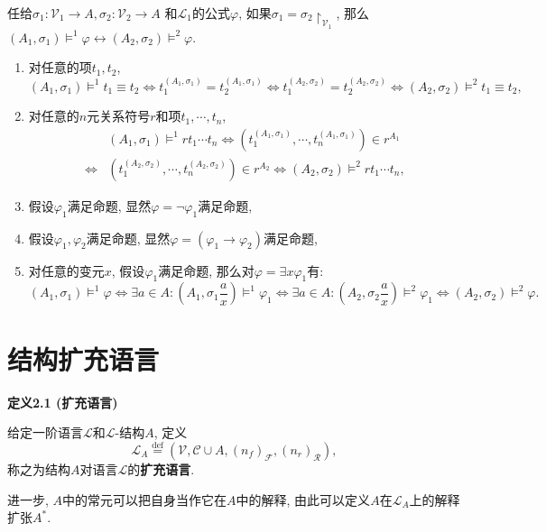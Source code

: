 任给$\sigma_1:\mathcal{V}_1\to A,\sigma_2:\mathcal{V}_2\to A$
和$\mathcal{L}_1$的公式$\varphi$, 如果$\sigma_1=\sigma_2\!\restriction_{\mathcal{V}_1}$, 那么
$(A_1,\sigma_1)\models^1\varphi\leftrightarrow(A_2,\sigma_2)\models^2\varphi$.


\begin{enumerate}
    \item 对任意的项$t_1,t_2$,
    \[
        (A_1,\sigma_1)\models^1t_1\equiv t_2\iff
        t_1^{(A_1,\sigma_1)}=t_2^{(A_1,\sigma_1)}\iff
        t_1^{(A_2,\sigma_2)}=t_2^{(A_2,\sigma_2)}\iff
        (A_2,\sigma_2)\models^2t_1\equiv t_2,
    \]
    \item 对任意的$n$元关系符号$r$和项$t_1,\cdots,t_n$,
    \[\begin{aligned}
        &(A_1,\sigma_1)\models^1rt_1\cdots t_n\iff
        (t_1^{(A_1,\sigma_1)},\cdots,t_n^{(A_1,\sigma_1)})\in r^{A_1}\\[-3pt]
        \iff&(t_1^{(A_2,\sigma_2)},\cdots,t_n^{(A_2,\sigma_2)})\in r^{A_2}\iff
        (A_2,\sigma_2)\models^2rt_1\cdots t_n,
    \end{aligned}\]
    \item 假设$\varphi_1$满足命题, 显然$\varphi=\neg\varphi_1$满足命题,
    \item 假设$\varphi_1,\varphi_2$满足命题,
    显然$\varphi=(\varphi_1\to\varphi_2)$满足命题,
    \item 对任意的变元$x$, 假设$\varphi_1$满足命题,
    那么对$\varphi=\exists x\varphi_1$有:
    \begin{equation*}
        (A_1,\sigma_1)\models^1\varphi\iff
        \exists a\in A:\left(A_1,\sigma_1\frac{a}{x}\right)\models^1\varphi_1\iff
        \exists a\in A:\left(A_2,\sigma_2\frac{a}{x}\right)\models^2\varphi_1\iff
        (A_2,\sigma_2)\models^2\varphi.
    \tag*{\qedsymbol}\end{equation*}
\end{enumerate}

\vspace{20pt}





\section{结构扩充语言}

\hypertarget{sec:定义2.1}{}
\noindent\textbf{定义2.1 (扩充语言)}

给定一阶语言$\mathcal{L}$和$\mathcal{L}$-结构$A$, 定义
\[
    \mathcal{L}_A\overset{\mathrm{def}}{=}(\mathcal{V},\mathcal{C}\cup A,
    (n_f)_{\mathcal{F}},(n_r)_{\mathcal{R}}),
\]
称之为结构$A$对语言$\mathcal{L}$的\textbf{扩充语言}.


\vspace{10pt}

进一步, $A$中的常元可以把自身当作它在$A$中的解释,
由此可以定义$A$在$\mathcal{L}_A$上的解释扩张$A^*$.


